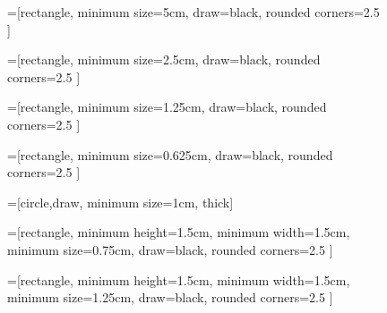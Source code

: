 \begin{figure}[tp]


=[rectangle,
                                            minimum size=5cm,
                                            draw=black,
                                            rounded corners=2.5 ]

=[rectangle,
                                            minimum size=2.5cm,
                                            draw=black,
                                            rounded corners=2.5 ]

=[rectangle,
                                              minimum size=1.25cm,
                                              draw=black,
                                              rounded corners=2.5 ]

=[rectangle,
                                              minimum size=0.625cm,
                                              draw=black,
                                              rounded corners=2.5 ]

=[circle,draw, minimum size=1cm, thick]

=[rectangle,
                                            minimum height=1.5cm, 
                                            minimum width=1.5cm, 
                                            minimum size=0.75cm,
                                            draw=black,
                                            rounded corners=2.5 ]
                                            
=[rectangle,
                                            minimum height=1.5cm, 
                                            minimum width=1.5cm, 
                                            minimum size=1.25cm,
                                            draw=black,
                                            rounded corners=2.5 ]

\hspace{0.05\textwidth}
\begin{adjustbox}{minipage=\textwidth, scale=0.5}
  \centering
{}
\end{adjustbox}
\end{figure}
